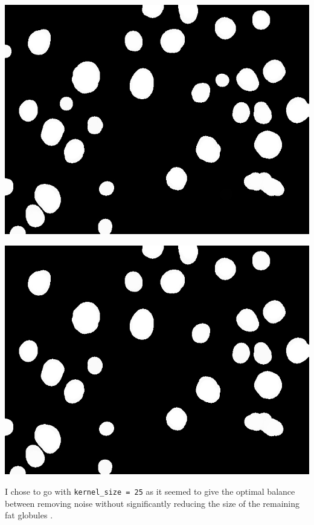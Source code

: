 \documentclass[a4paper]{article}
\begin{document}
\begin{minipage}{0.24\textwidth}
    \centering
    \includegraphics[width=\textwidth]{../code/task1/output/kernel_size_29.jpg}
\end{minipage}
\hfill
\begin{minipage}{0.24\textwidth}
    \centering
    \includegraphics[width=\textwidth]{../code/task1/output/kernel_size_31.jpg}
\end{minipage}

I chose to go with \texttt{kernel_size = 25} as it seemed to give the optimal balance between removing noise without significantly reducing the size of the remaining fat globules .
\end{document}
